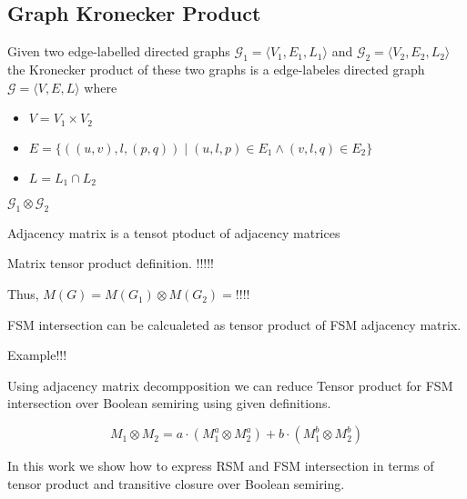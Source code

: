 \subsection{Graph Kronecker Product}



\begin{definition}
Given two edge-labelled directed graphs $\mathcal{G}_1=\langle V_1, E_1, L_1 \rangle$ and $\mathcal{G}_2=\langle V_2, E_2, L_2 \rangle$ the Kronecker product of these two graphs is a edge-labeles directed graph $\mathcal{G}=\langle V, E, L \rangle$ where 
\begin{itemize}
	\item $V = V_1 \times V_2$
	\item $E = \{((u,v),l,(p,q)) \mid (u,l,p) \in E_1 \wedge (v,l,q) \in E_2 \}$
	\item $L = L_1 \cap L_2$
\end{itemize}
 $\mathcal{G}_1 \otimes \mathcal{G}_2$ 
\end{definition}

Adjacency matrix is a tensot ptoduct of adjacency matrices

\begin{definition}
Matrix tensor product definition.
!!!!!
\end{definition}

Thus, $M(G) = M(G_1) \otimes M(G_2) = !!!!$


FSM intersection can be calcualeted as tensor product of FSM adjacency matrix.

Example!!!

Using adjacency matrix decompposition we can reduce Tensor product for FSM intersection over Boolean semiring using given definitions.

$$ M_1 \otimes M_2 = a \cdot (M_1^a \otimes M_2^a) + b \cdot (M_1^b \otimes M_2^b) $$

In this work we show how to express RSM and FSM intersection in terms of tensor product and transitive closure over Boolean semiring.
